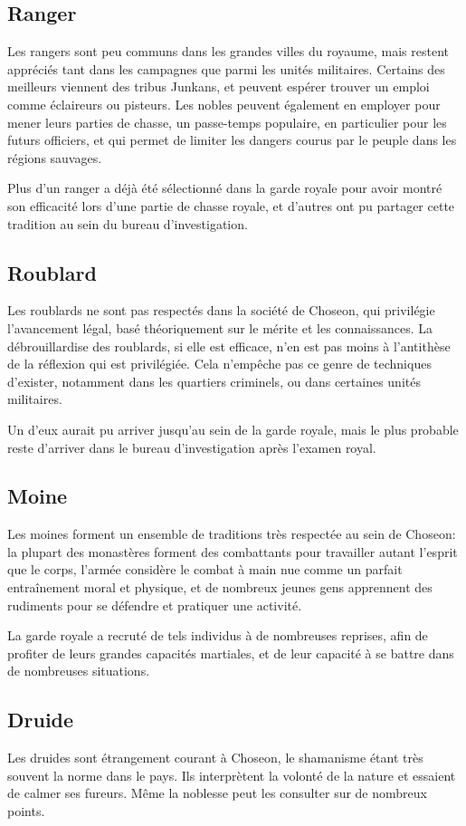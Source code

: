 \documentclass[10pt,a4paper]{book}
\newcommand{\nomroyaume}{Choseon}
\begin{document}
\subsection{Ranger}
Les rangers sont peu communs dans les grandes villes du royaume, mais restent appréciés tant dans les campagnes que parmi les unités militaires. Certains des meilleurs viennent des tribus Junkans, et peuvent espérer trouver un emploi comme éclaireurs ou pisteurs. Les nobles peuvent également en employer pour mener leurs parties de chasse, un passe-temps populaire, en particulier pour les futurs officiers, et qui permet de limiter les dangers courus par le peuple dans les régions sauvages.

Plus d'un ranger a déjà été sélectionné dans la garde royale pour avoir montré son efficacité lors d'une partie de chasse royale, et d'autres ont pu partager cette tradition au sein du bureau d'investigation.
\subsection{Roublard}
Les roublards ne sont pas respectés dans la société de \nomroyaume, qui privilégie l'avancement légal, basé théoriquement sur le mérite et les connaissances. La débrouillardise des roublards, si elle est efficace, n'en est pas moins à l'antithèse de la réflexion qui est privilégiée. Cela n'empêche pas ce genre de techniques d'exister, notamment dans les quartiers criminels, ou dans certaines unités militaires.

Un d'eux aurait pu arriver jusqu'au sein de la garde royale, mais le plus probable reste d'arriver dans le bureau d'investigation après l'examen royal.
\subsection{Moine}
Les moines forment un ensemble de traditions très respectée au sein de \nomroyaume : la plupart des monastères forment des combattants pour travailler autant l'esprit que le corps, l'armée considère le combat à main nue comme un parfait entraînement moral et physique, et de nombreux jeunes gens apprennent des rudiments pour se défendre et pratiquer une activité.

La garde royale a recruté de tels individus à de nombreuses reprises, afin de profiter de leurs grandes capacités martiales, et de leur capacité à se battre dans de nombreuses situations.
\subsection{Druide}
Les druides sont étrangement courant à \nomroyaume, le shamanisme étant très souvent la norme dans le pays. Ils interprètent la volonté de la nature et essaient de calmer ses fureurs. Même la noblesse peut les consulter sur de nombreux points.
\end{document}
